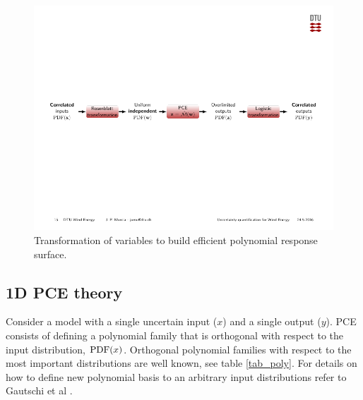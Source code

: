 \documentclass[preprint,12pt]{elsarticle}
\begin{document}

\begin{figure}[h!]
\begin{centering}
\includegraphics[width=\columnwidth]{Figures/2_transfromation_steps.pdf}
\caption{Transformation of variables to build efficient polynomial response surface.}
\label{fig_2_trans}
\end{centering}
\end{figure}


\subsection{1D PCE theory}


Consider a model with a single uncertain input ($x$) and a single output ($y$). PCE consists of defining a polynomial family that is orthogonal with respect to the input distribution, $\mathrm{PDF}(x)$. Orthogonal polynomial families with respect to the most important distributions are well known, see table \ref{tab_poly}. For details on how to define new polynomial basis to an arbitrary input distributions refer to Gautschi et al \cite{gautschi1994algorithm}.
\end{document}
